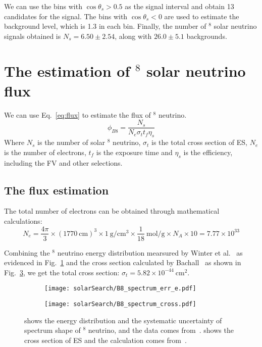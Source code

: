 We can use the bins with $\cos\theta_s > 0.5$ as the signal interval and obtain 13 candidates for the signal. The bins with $\cos\theta_s < 0$ are used to estimate the background level, which is 1.3 in each bin. Finally, the number of $^8$ solar neutrino signals obtained is $N_s=6.50\pm2.54$, along with $26.0\pm5.1$ backgrounds.

\section{The estimation of $^8$ solar neutrino flux}
\label{sec:solar_flux}
We can use Eq.~\eqref{eq:flux} to estimate the flux of $^8$ neutrino.
\begin{equation}
	\phi_{B8}=\frac{N_s}{N_e\sigma_t t_f \eta_s}
	\label{eq:flux}
\end{equation}
Where $N_s$ is the number of solar $^8$ neutrino, $\sigma_t$ is the total cross section of ES, $N_e$ is the number of electrons, $t_f$ is the exposure time and $\eta_s$ is the efficiency, including the FV and other selections.

\subsection{The flux estimation}
The total number of electrons can be obtained through mathematical calculations:
\begin{equation}
	N_e=\frac{4\pi}{3}\times (1770~\text{cm})^3\times 1~\text{g}/\text{cm}^3\times \frac{1}{18}~\text{mol}/\text{g}\times N_A\times 10=7.77\times10^{33}
\end{equation}

Combining the $^8$ neutrino energy distribution mearsured by Winter et al.~\cite{B8_winter} as evidenced in Fig.~\ref{fig:solar_B8_err_e} and the cross section calculated by Bachall~\cite{Bahcall_correct} as shown in Fig.~\ref{fig:solar_B8_cross}, we get the total cross section: $\sigma_t=5.82\times10^{-44}~\text{cm}^2$.
\begin{figure}[htbp]
	\centering
	\begin{subfigure}{0.5\textwidth}
		\centering
		\texttt{[image: solarSearch/B8\_spectrum\_err\_e.pdf]}
		\caption{}
		\label{fig:solar_B8_err_e}
	\end{subfigure}%
	\begin{subfigure}{0.5\textwidth}
		\centering
		\texttt{[image: solarSearch/B8\_spectrum\_cross.pdf]}
		\caption{}
		\label{fig:solar_B8_cross}
	\end{subfigure}
	\caption{ shows the energy distribution and the systematic uncertainty of spectrum shape of $^8$ neutrino, and the data comes from~\cite{B8_winter}.  shows the cross section of ES and the calculation comes from~\cite{Bahcall_correct}.}
\end{figure}

